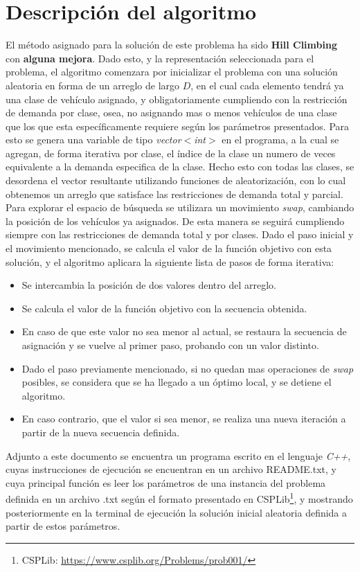 \documentclass[letter, 10pt]{article}
\begin{document}
\section{Descripción del algoritmo}
El método asignado para la solución de este problema ha sido \textbf{Hill Climbing} con \textbf{alguna mejora}. Dado esto, y la representación seleccionada para el problema, el algoritmo comenzara por inicializar el problema con una solución aleatoria en forma de un arreglo de largo $D$, en el cual cada elemento tendrá ya una clase de vehículo asignado, y obligatoriamente cumpliendo con la restricción de demanda por clase, osea, no asignando mas o menos vehículos de una clase que los que esta específicamente requiere según los parámetros presentados. Para esto se genera una variable de tipo \textit{vector$<$int$>$} en el programa, a la cual se agregan, de forma iterativa por clase, el índice de la clase un numero de veces equivalente a la demanda especifica de la clase. Hecho esto con todas las clases, se desordena el vector resultante utilizando funciones de aleatorización, con lo cual obtenemos un arreglo que satisface las restricciones de demanda total y parcial.\\
Para explorar el espacio de búsqueda se utilizara un movimiento \textit{swap}, cambiando la posición de los vehículos ya asignados. De esta manera se seguirá cumpliendo siempre con las restricciones de demanda total y por clases. Dado el paso inicial y el movimiento mencionado, se calcula el valor de la función objetivo con esta solución, y el algoritmo aplicara la siguiente lista de pasos de forma iterativa:
\begin{itemize}
    \item Se intercambia la posición de dos valores dentro del arreglo.
    \item Se calcula el valor de la función objetivo con la secuencia obtenida.
    \item En caso de que este valor no sea menor al actual, se restaura la secuencia de asignación y se vuelve al primer paso, probando con un valor distinto.
    \item Dado el paso previamente mencionado, si no quedan mas operaciones de \textit{swap} posibles, se considera que se ha llegado a un óptimo local, y se detiene el algoritmo.
    \item En caso contrario, que el valor si sea menor, se realiza una nueva iteración a partir de la nueva secuencia definida.
\end{itemize}
Adjunto a este documento se encuentra un programa escrito en el lenguaje \textit{C++}, cuyas instrucciones de ejecución se encuentran en un archivo README.txt, y cuya principal función es leer los parámetros de una instancia del problema definida en un archivo .txt según el formato presentado en CSPLib\footnote{CSPLib: \url{https://www.csplib.org/Problems/prob001/}}, y mostrando posteriormente en la terminal de ejecución la solución inicial aleatoria definida a partir de estos parámetros.



\end{document}
